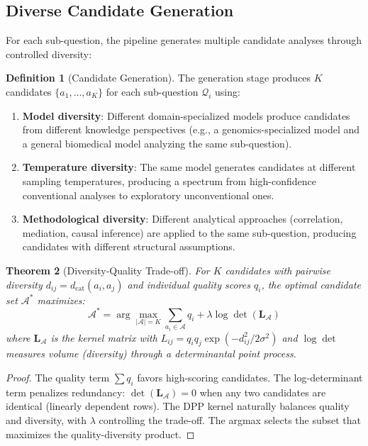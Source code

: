 \documentclass[10pt,twocolumn]{article}
\newtheorem{theorem}{Theorem}[section]
\theoremstyle{definition}
\newtheorem{definition}[theorem]{Definition}
\theoremstyle{remark}
\newcommand{\dcat}{d_{\mathrm{cat}}}
\newcommand{\question}{\mathcal{Q}}
\begin{document}
\subsection{Diverse Candidate Generation}

For each sub-question, the pipeline generates multiple candidate analyses through controlled diversity:

\begin{definition}[Candidate Generation]
The generation stage produces $K$ candidates $\{a_1, \ldots, a_K\}$ for each sub-question $\question_i$ using:
\begin{enumerate}[nosep]
\item \textbf{Model diversity}: Different domain-specialized models \cite{jacobs1991,shazeer2017} produce candidates from different knowledge perspectives (e.g., a genomics-specialized model and a general biomedical model analyzing the same sub-question).
\item \textbf{Temperature diversity}: The same model generates candidates at different sampling temperatures, producing a spectrum from high-confidence conventional analyses to exploratory unconventional ones.
\item \textbf{Methodological diversity}: Different analytical approaches (correlation, mediation, causal inference) are applied to the same sub-question, producing candidates with different structural assumptions.
\end{enumerate}
\end{definition}

\begin{theorem}[Diversity-Quality Trade-off]
\label{thm:diversity}
For $K$ candidates with pairwise diversity $d_{ij} = \dcat(a_i, a_j)$ and individual quality scores $q_i$, the optimal candidate set $\mathcal{A}^*$ maximizes:
\begin{equation}
\mathcal{A}^* = \arg\max_{|\mathcal{A}| = K} \sum_{a_i \in \mathcal{A}} q_i + \lambda \log \det(\mathbf{L}_\mathcal{A})
\end{equation}
where $\mathbf{L}_\mathcal{A}$ is the kernel matrix with $L_{ij} = q_i q_j \exp(-d_{ij}^2 / 2\sigma^2)$ and $\log \det$ measures volume (diversity) through a determinantal point process.
\end{theorem}

\begin{proof}
The quality term $\sum q_i$ favors high-scoring candidates. The log-determinant term penalizes redundancy: $\det(\mathbf{L}_\mathcal{A}) = 0$ when any two candidates are identical (linearly dependent rows). The DPP kernel naturally balances quality and diversity, with $\lambda$ controlling the trade-off. The argmax selects the subset that maximizes the quality-diversity product.
\end{proof}
\end{document}
